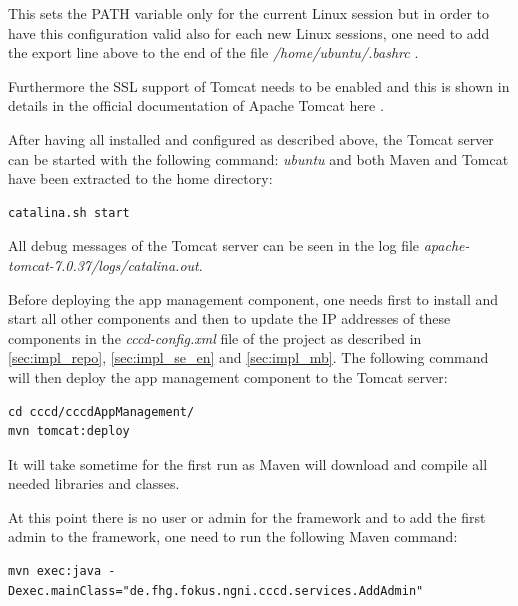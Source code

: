\begin{itemize}
This sets the PATH variable only for the current Linux session but in order to have this configuration valid also for each new Linux sessions, one need to add the export line above to the end of the file \textit{/home/ubuntu/.bashrc} .

Furthermore the SSL support of Tomcat needs to be enabled and this is shown in details in the official documentation of Apache Tomcat here \cite{tomcat_ssl}.

\end{itemize}

After having all installed and configured as described above, the Tomcat server can be started with the following command:
\textit{ubuntu} and both Maven and Tomcat have been extracted to the home directory:
\begin{code}
\begin{verbatim}
catalina.sh start
\end{verbatim}
\end{code} 

All debug messages of the Tomcat server can be seen in the log file \textit{apache-tomcat-7.0.37/logs/catalina.out}. 

Before deploying the app management component, one needs first to install and start all other components and then to update the IP addresses of these components in the \textit{cccd-config.xml} file of the project as described in \ref{sec:impl_repo}, \ref{sec:impl_se_en} and \ref{sec:impl_mb}. The following command will then deploy the app management component to the Tomcat server:
\begin{code}
\begin{verbatim}
cd cccd/cccdAppManagement/
mvn tomcat:deploy
\end{verbatim}
\end{code}

It will take sometime for the first run as Maven will download and compile all needed libraries and classes.

At this point there is no user or admin for the framework and to add the first admin to the framework, one need to run the following Maven command:

\begin{code}
\begin{verbatim}
mvn exec:java -Dexec.mainClass="de.fhg.fokus.ngni.cccd.services.AddAdmin"
\end{verbatim}
\end{code}

